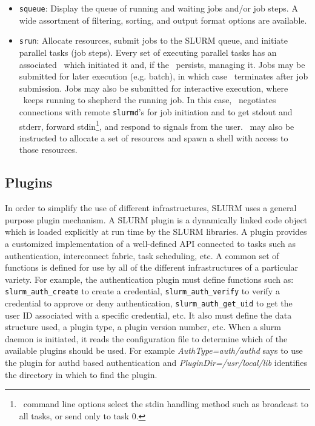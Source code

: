 \documentclass[10pt,onecolumn,times]{../common/llncs}
\begin{document}
{\begin{itemize}
\item {\tt squeue}: Display the queue of running and waiting jobs and/or
job steps. A wide assortment of filtering, sorting, and output format
options are available.

\item {\tt srun}: Allocate resources, submit jobs to the SLURM queue,
and initiate parallel tasks (job steps).  Every set of executing parallel
tasks has an associated \srun\ which initiated it and, if the \srun\
persists, managing it.  Jobs may be submitted for later execution
(e.g. batch), in which case \srun\ terminates after job submission.
Jobs may also be submitted for interactive execution, where \srun\ keeps
running to shepherd the running job. In this case, \srun\ negotiates
connections with remote {\tt slurmd}'s for job initiation and to get
stdout and stderr, forward stdin\footnote{\srun\ command line options
select the stdin handling method such as broadcast to all tasks, or
send only to task 0.}, and respond to signals from the user.  \srun\
may also be instructed to allocate a set of resources and spawn a shell
with access to those resources.

\end{itemize}

\subsection{Plugins}

In order to simplify the use of different infrastructures,
SLURM uses a general purpose plugin mechanism.  A SLURM plugin is a
dynamically linked code object which is loaded explicitly at run time
by the SLURM libraries.  A plugin provides a customized implementation
of a well-defined API connected to tasks such as authentication,
interconnect fabric, task scheduling, etc.  A common set of functions is defined
for use by all of the different infrastructures of a particular variety.
For example, the authentication plugin must define functions such as: 
{\tt slurm\_auth\_create} to create a credential, {\tt slurm\_auth\_verify}
to verify a credential to approve or deny authentication, 
{\tt slurm\_auth\_get\_uid} to get the user ID associated with a specific
credential, etc.  It also must define the data structure used, a plugin
type, a plugin version number, etc.  When a slurm daemon is initiated, it
reads the configuration file to determine which of the available plugins
should be used.  For example {\em AuthType=auth/authd} says to use the
plugin for authd based authentication and {\em PluginDir=/usr/local/lib}
identifies the directory in which to find the plugin.

}
\end{document}
